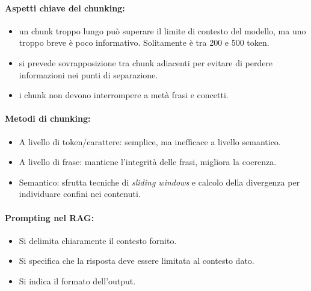 \paragraph{Aspetti chiave del chunking:}

\begin{itemize}
  \item {} un chunk troppo lungo può superare il limite di contesto del modello, ma uno troppo breve è poco informativo. Solitamente è tra 200 e 500 token. 
  \item {} si prevede sovrapposizione tra chunk adiacenti per evitare di perdere informazioni nei punti di separazione. 
    \item {} i chunk non devono interrompere a metà frasi e concetti.
\end{itemize}

\paragraph{Metodi di chunking:}

\begin{itemize}
  \item A livello di token/carattere: semplice, ma inefficace a livello semantico. 
  \item A livello di frase: mantiene l'integrità delle frasi, migliora la coerenza. 
  \item Semantico: sfrutta tecniche di \textit{sliding windows} e calcolo della divergenza per individuare confini nei contenuti. 
\end{itemize}


\paragraph{Prompting nel RAG:}

\begin{itemize}
  \item Si delimita chiaramente il contesto fornito. 
  \item Si specifica che la risposta deve essere limitata al contesto dato. 
  \item Si indica il formato dell'output.
\end{itemize}

